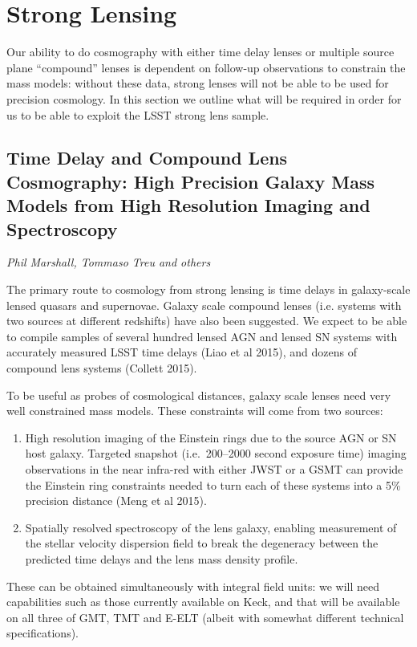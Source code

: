 
\section{Strong Lensing}
\label{sec:sl}

Our ability to do cosmography with either time delay lenses or multiple 
source plane ``compound'' lenses is dependent on follow-up observations
to constrain the mass models: without these data, strong lenses will not
be able to be used for precision cosmology. In this section we outline what will be 
required in order for us to be able to exploit the LSST strong lens sample.


\subsection{Time Delay and Compound Lens Cosmography: High Precision Galaxy Mass Models from High Resolution Imaging and Spectroscopy}
{\it Phil Marshall, Tommaso Treu and others}

The primary route to cosmology from strong lensing is time delays in
galaxy-scale lensed quasars and supernovae. Galaxy scale compound lenses
(i.e. systems with two sources at different redshifts) have also been
suggested. We expect to be able to compile samples of several hundred lensed AGN
and lensed SN systems with accurately measured LSST time delays (Liao et al 2015), 
and dozens of compound lens systems (Collett 2015).

To be useful as probes of cosmological distances, galaxy scale lenses
need very well constrained mass models. These constraints will come from
two sources:
\begin{enumerate}
\item High resolution imaging of the Einstein rings due to the source AGN
or SN host galaxy. Targeted snapshot (i.e.\ 200--2000 second exposure time) imaging
observations in the near infra-red with either JWST or a GSMT
can provide the Einstein ring constraints needed to turn
each of these systems into a  5\% precision distance (Meng et al 2015).
\item Spatially resolved spectroscopy of the lens
galaxy, enabling measurement of the stellar velocity dispersion field to
break the degeneracy between the predicted time delays and the lens mass
density profile.
\end{enumerate}
These can be obtained simultaneously with integral field units: we will
need capabilities such as those currently available on Keck, and that
will be available on all three of GMT, TMT and E-ELT 
(albeit with somewhat different technical specifications).


